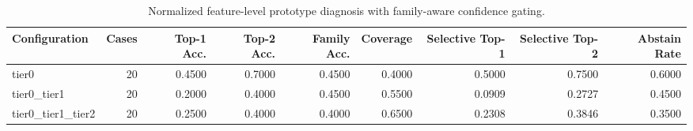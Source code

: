 \begin{table}[t]
\centering
\caption{Normalized feature-level prototype diagnosis with family-aware confidence gating.}
\label{tab:dice_stressor_hierarchical_diagnosis}
\footnotesize
\begin{tabular}{lrrrrrrrr}
\toprule
Configuration & Cases & Top-1 Acc. & Top-2 Acc. & Family Acc. & Coverage & Selective Top-1 & Selective Top-2 & Abstain Rate \\
\midrule
tier0 & 20 & 0.4500 & 0.7000 & 0.4500 & 0.4000 & 0.5000 & 0.7500 & 0.6000 \\
tier0_tier1 & 20 & 0.2000 & 0.4000 & 0.4500 & 0.5500 & 0.0909 & 0.2727 & 0.4500 \\
tier0_tier1_tier2 & 20 & 0.2500 & 0.4000 & 0.4000 & 0.6500 & 0.2308 & 0.3846 & 0.3500 \\
\bottomrule
\end{tabular}

\end{table}
